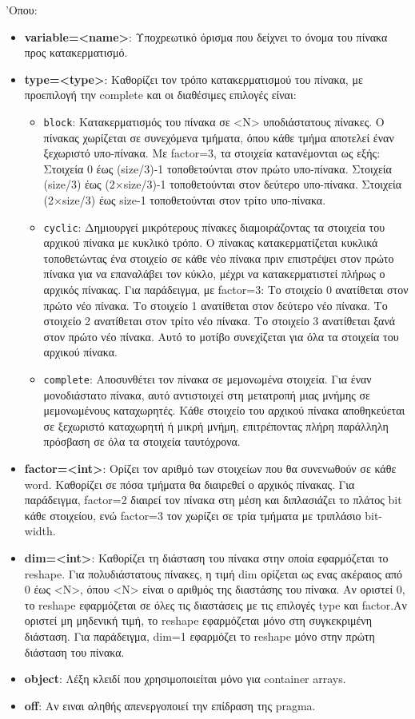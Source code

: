 'Οπου:
\begin{itemize}
  \item \textbf{variable=<name>}: Υποχρεωτικό όρισμα που δείχνει το όνομα του πίνακα προς κατακερματισμό.
  \item \textbf{type=<type>}: Καθορίζει τον τρόπο κατακερματισμού του πίνακα, με προεπιλογή την complete και οι διαθέσιμες επιλογές είναι:
  \begin{itemize}
    \item \texttt{block}: Κατακερματισμός του πίνακα σε <N> υποδιάστατους πίνακες.
    Ο πίνακας χωρίζεται σε συνεχόμενα τμήματα, όπου κάθε τμήμα αποτελεί έναν ξεχωριστό υπο-πίνακα. Με factor=3, τα στοιχεία κατανέμονται ως εξής:
    Στοιχεία 0 έως (size/3)-1 τοποθετούνται στον πρώτο υπο-πίνακα.
    Στοιχεία (size/3) έως (2×size/3)-1 τοποθετούνται στον δεύτερο υπο-πίνακα.
    Στοιχεία (2×size/3) έως size-1 τοποθετούνται στον τρίτο υπο-πίνακα.
    \item \texttt{cyclic}: Δημιουργεί μικρότερους πίνακες διαμοιράζοντας τα στοιχεία του αρχικού πίνακα με κυκλικό τρόπο.
    Ο πίνακας κατακερματίζεται κυκλικά τοποθετώντας ένα στοιχείο σε κάθε νέο πίνακα πριν επιστρέψει στον πρώτο πίνακα για να επαναλάβει τον κύκλο, μέχρι να κατακερματιστεί πλήρως ο αρχικός πίνακας. Για παράδειγμα, με factor=3:
    Το στοιχείο 0 ανατίθεται στον πρώτο νέο πίνακα. Το στοιχείο 1 ανατίθεται στον δεύτερο νέο πίνακα.
    Το στοιχείο 2 ανατίθεται στον τρίτο νέο πίνακα. Το στοιχείο 3 ανατίθεται ξανά στον πρώτο νέο πίνακα.
    Αυτό το μοτίβο συνεχίζεται για όλα τα στοιχεία του αρχικού πίνακα.
    \item \texttt{complete}: Αποσυνθέτει τον πίνακα σε μεμονωμένα στοιχεία. Για έναν μονοδιάστατο πίνακα, αυτό αντιστοιχεί στη μετατροπή μιας μνήμης σε μεμονωμένους καταχωρητές.
    Κάθε στοιχείο του αρχικού πίνακα αποθηκεύεται σε ξεχωριστό καταχωρητή ή μικρή μνήμη, επιτρέποντας πλήρη παράλληλη πρόσβαση σε όλα τα στοιχεία ταυτόχρονα.
  \end{itemize}
  \item \textbf{factor=<int>}: Ορίζει τον αριθμό των στοιχείων που θα συνενωθούν σε κάθε word.
  Καθορίζει σε πόσα τμήματα θα διαιρεθεί ο αρχικός πίνακας.
  Για παράδειγμα, factor=2 διαιρεί τον πίνακα στη μέση και διπλασιάζει το πλάτος bit κάθε στοιχείου, ενώ factor=3 τον χωρίζει σε τρία τμήματα με τριπλάσιο bit-width.
  \item \textbf{dim=<int>}: Καθορίζει τη διάσταση του πίνακα στην οποία εφαρμόζεται το reshape.
  Για πολυδιάστατους πίνακες, η τιμή dim ορίζεται ως ενας ακέραιος από 0 έως <N>, όπου <N> είναι ο αριθμός της διαστάσης του πίνακα.
  Αν οριστεί 0, το reshape εφαρμόζεται σε όλες τις διαστάσεις με τις επιλογές type και factor.Αν οριστεί μη μηδενική τιμή, το reshape εφαρμόζεται μόνο στη συγκεκριμένη διάσταση. Για παράδειγμα, dim=1 εφαρμόζει το reshape μόνο στην πρώτη διάσταση του πίνακα.
  \item \textbf{object}: Λέξη κλειδί που χρησιμοποιείται μόνο για container arrays.
  \item \textbf{off}: Αν ειναι αληθής απενεργοποιεί την επίδραση της pragma.
\end{itemize}
    

